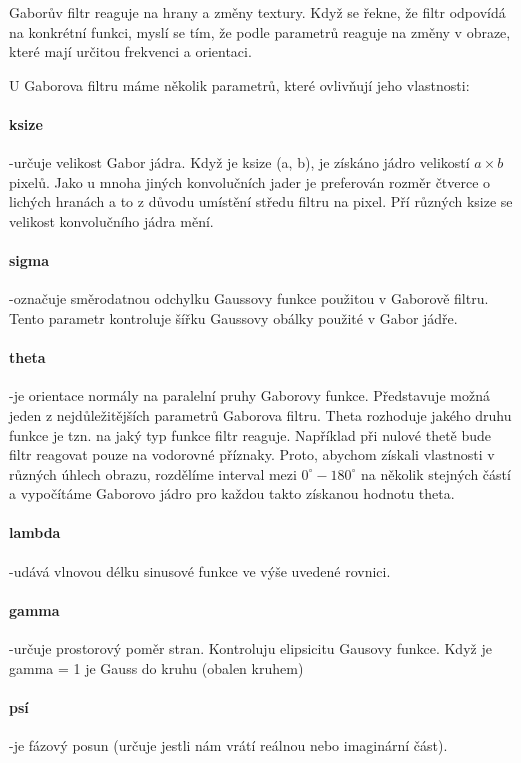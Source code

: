 \documentclass[czech,BP]{thesiskiv}
\begin{document}
\par Gaborův filtr reaguje na hrany a změny textury. Když se řekne, že filtr odpovídá na konkrétní funkci, myslí se tím, že podle parametrů reaguje na změny v obraze, které mají určitou frekvenci a orientaci. 

U Gaborova filtru máme několik parametrů, které ovlivňují jeho vlastnosti: 
\paragraph{ksize} -určuje velikost Gabor jádra. Když je ksize (a, b), je získáno jádro velikostí $a \times b$ pixelů. Jako u mnoha jiných konvolučních jader je preferován rozměr čtverce o lichých hranách a to z důvodu umístění středu filtru na pixel. Pří různých ksize se velikost konvolučního jádra mění. 

\paragraph{sigma} -označuje směrodatnou odchylku Gaussovy funkce použitou v Gaborově filtru. Tento parametr kontroluje šířku Gaussovy obálky použité v Gabor jádře.

\paragraph{theta} -je orientace normály na paralelní pruhy Gaborovy funkce. Představuje možná jeden z nejdůležitějších parametrů Gaborova filtru. Theta rozhoduje jakého druhu funkce je tzn. na jaký typ funkce filtr reaguje. Například při nulové thetě bude filtr reagovat pouze na vodorovné příznaky. Proto, abychom získali vlastnosti v různých úhlech obrazu, rozdělíme interval mezi $0^\circ-180^\circ$ na několik stejných částí a vypočítáme Gaborovo jádro pro každou takto získanou hodnotu theta.

\paragraph{lambda} -udává vlnovou délku sinusové funkce ve výše uvedené rovnici.

\paragraph{gamma} -určuje prostorový poměr stran. Kontroluju elipsicitu Gausovy funkce. Když je gamma = 1 je Gauss do kruhu (obalen kruhem)

\paragraph{psí} -je fázový posun (určuje jestli nám vrátí reálnou nebo imaginární část). \\ 
\end{document}
